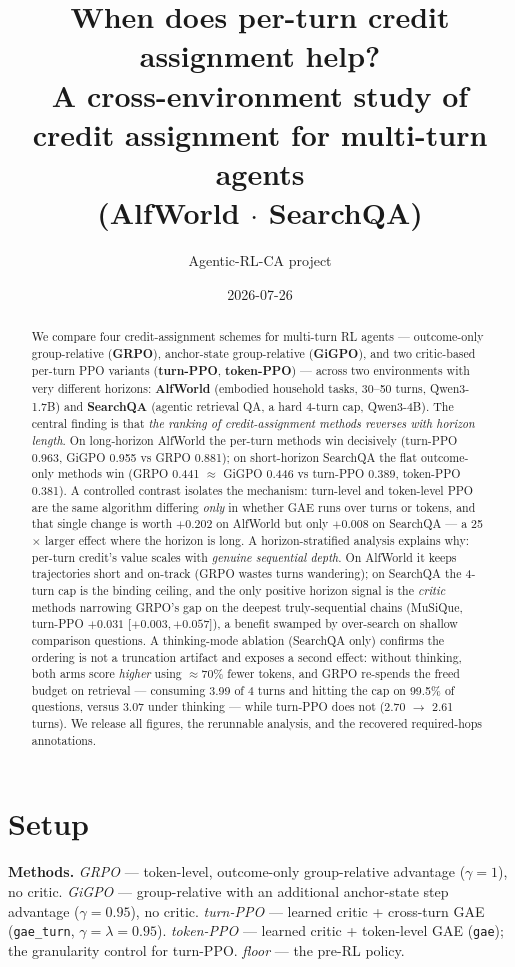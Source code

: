 \documentclass[11pt]{article}
\title{\textbf{When does per-turn credit assignment help?}\\[2pt]
\large A cross-environment study of credit assignment for multi-turn agents\\(AlfWorld $\cdot$ SearchQA)}
\author{Agentic-RL-CA project}
\date{2026-07-26}
\begin{document}
\maketitle

\begin{abstract}
\noindent We compare four credit-assignment schemes for multi-turn RL agents --- outcome-only
group-relative (\textbf{GRPO}), anchor-state group-relative (\textbf{GiGPO}), and two critic-based
per-turn PPO variants (\textbf{turn-PPO}, \textbf{token-PPO}) --- across two environments with very
different horizons: \textbf{AlfWorld} (embodied household tasks, 30--50 turns, Qwen3-1.7B) and
\textbf{SearchQA} (agentic retrieval QA, a hard 4-turn cap, Qwen3-4B). The central finding is that
\emph{the ranking of credit-assignment methods reverses with horizon length}. On long-horizon
AlfWorld the per-turn methods win decisively (turn-PPO 0.963, GiGPO 0.955 vs GRPO 0.881); on
short-horizon SearchQA the flat outcome-only methods win (GRPO 0.441 $\approx$ GiGPO 0.446 vs
turn-PPO 0.389, token-PPO 0.381). A controlled contrast isolates the mechanism: turn-level and
token-level PPO are the same algorithm differing \emph{only} in whether GAE runs over turns or
tokens, and that single change is worth $+0.202$ on AlfWorld but only $+0.008$ on SearchQA --- a
25$\times$ larger effect where the horizon is long. A horizon-stratified analysis explains why:
per-turn credit's value scales with \emph{genuine sequential depth}. On AlfWorld it keeps trajectories short and
on-track (GRPO wastes turns wandering); on SearchQA the 4-turn cap is the binding ceiling, and the
only positive horizon signal is the \emph{critic} methods narrowing GRPO's gap on the deepest
truly-sequential chains (MuSiQue, turn-PPO $+0.031$ [$+0.003,+0.057$]), a benefit swamped by
over-search on shallow comparison questions. A thinking-mode ablation (SearchQA only) confirms the ordering is not a
truncation artifact and exposes a second effect: without thinking, both arms score \emph{higher}
using $\approx$70\% fewer tokens, and GRPO re-spends the freed budget on retrieval --- consuming
3.99 of 4 turns and hitting the cap on 99.5\% of questions, versus 3.07 under thinking --- while
turn-PPO does not (2.70 $\to$ 2.61 turns). We release all figures, the rerunnable analysis, and the recovered required-hops
annotations.
\end{abstract}

\section{Setup}
\textbf{Methods.} \emph{GRPO} --- token-level, outcome-only group-relative advantage ($\gamma{=}1$),
no critic. \emph{GiGPO} --- group-relative with an additional anchor-state step advantage
($\gamma{=}0.95$), no critic. \emph{turn-PPO} --- learned critic + cross-turn GAE
(\texttt{gae\_turn}, $\gamma{=}\lambda{=}0.95$). \emph{token-PPO} --- learned critic + token-level
GAE (\texttt{gae}); the granularity control for turn-PPO. \emph{floor} --- the pre-RL policy.
\end{document}
